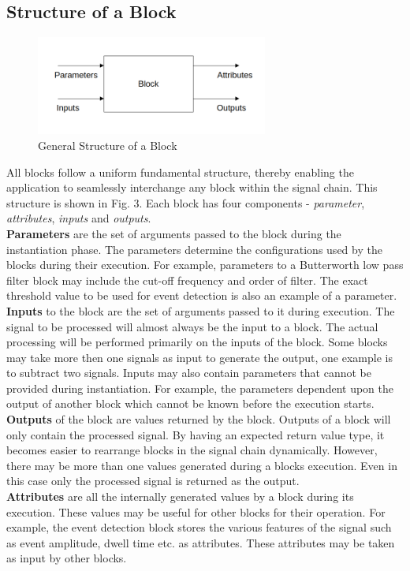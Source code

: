 \documentclass[journal]{IEEEtran}
\begin{document}
\subsection{Structure of a Block}


\begin{figure}[!t]
\centering
\includegraphics[width=3in]{imgs/Block.png}
\caption{General Structure of a Block}
\label{fig_3}
\end{figure}

All blocks follow a uniform fundamental structure, thereby enabling the application to seamlessly interchange any block within the signal chain. This structure is shown in Fig. 3. Each block has four components - \textit{parameter}, \textit{attributes}, \textit{inputs} and \textit{outputs}. \\
{\bf{Parameters}} are the set of arguments passed to the block during the instantiation phase. The parameters determine the configurations used by the blocks during their execution. For example, parameters to a Butterworth low pass filter block may include the cut-off frequency and order of filter. The exact threshold value to be used for event detection is also an example of a parameter. \\
{\bf{Inputs}} to the block are the set of arguments passed to it during execution. The signal to be processed will almost always be the input to a block. The actual processing will be performed primarily on the inputs of the block. Some blocks may take more then one signals as input to generate the output, one example is to subtract two signals. Inputs may also contain parameters that cannot be provided during instantiation. For example, the parameters dependent upon the output of another block which cannot be known before the execution starts. \\
{\bf{Outputs}} of the block are values returned by the block. Outputs of a block will only contain the processed signal. By having an expected return value type, it becomes easier to rearrange blocks in the signal chain dynamically. However, there may be more than one values generated during a blocks execution. Even in this case only the processed signal is returned as the output. \\
{\bf{Attributes}} are all the internally generated values by a block during its execution. These values may be useful for other blocks for their operation. For example, the event detection block stores the various features of the signal such as event amplitude, dwell time etc. as attributes. These attributes may be taken as input by other blocks.
\end{document}
